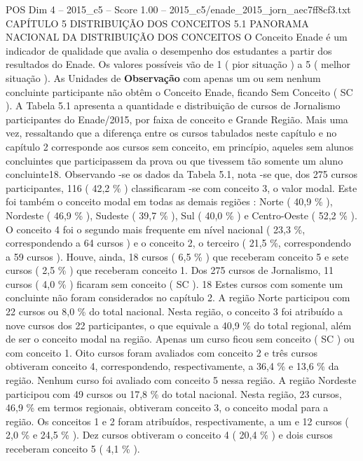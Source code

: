 \begin{textsample}{POS Dim 4 – 2015\_c5 – Score 1.00 – 2015\_c5/enade\_2015\_jorn\_aec7ff8cf3.txt}  \label{ex:f4_pos_165}
CAPÍTULO 5 DISTRIBUIÇÃO DOS CONCEITOS 5.1 PANORAMA NACIONAL DA DISTRIBUIÇÃO DOS CONCEITOS O Conceito Enade é um indicador de qualidade que avalia o desempenho dos estudantes a partir dos resultados do Enade.
Os valores possíveis vão de 1 ( pior situação ) a 5 ( melhor situação ).
As Unidades de \textbf{Observação} com apenas um ou sem nenhum concluinte participante não obtêm o Conceito Enade, ficando Sem Conceito ( SC ).
A Tabela 5.1 apresenta a quantidade e distribuição de cursos de Jornalismo participantes do Enade/2015, por faixa de conceito e Grande Região.
Mais uma vez, ressaltando que a diferença entre os cursos tabulados neste capítulo e no capítulo 2 corresponde aos cursos sem conceito, em princípio, aqueles sem alunos concluintes que participassem da prova ou que tivessem tão somente um aluno concluinte18.
Observando -se os dados da Tabela 5.1, nota -se que, dos 275 cursos participantes, 116 ( 42,2 \% ) classificaram -se com conceito 3, o valor modal.
Este foi também o conceito modal em todas as demais regiões : Norte ( 40,9 \% ), Nordeste ( 46,9 \% ), Sudeste ( 39,7 \% ), Sul ( 40,0 \% ) e Centro-Oeste ( 52,2 \% ).
O conceito 4 foi o segundo mais frequente em nível nacional ( 23,3 \%, correspondendo a 64 cursos ) e o conceito 2, o terceiro ( 21,5 \%, correspondendo a 59 cursos ).
Houve, ainda, 18 cursos ( 6,5 \% ) que receberam conceito 5 e sete cursos ( 2,5 \% ) que receberam conceito 1.
Dos 275 cursos de Jornalismo, 11 cursos ( 4,0 \% ) ficaram sem conceito ( SC ). 18 Estes cursos com somente um concluinte não foram considerados no capítulo 2.
A região Norte participou com 22 cursos ou 8,0 \% do total nacional.
Nesta região, o conceito 3 foi atribuído a nove cursos dos 22 participantes, o que equivale a 40,9 \% do total regional, além de ser o conceito modal na região.
Apenas um curso ficou sem conceito ( SC ) ou com conceito 1.
Oito cursos foram avaliados com conceito 2 e três cursos obtiveram conceito 4, correspondendo, respectivamente, a 36,4 \% e 13,6 \% da região.
Nenhum curso foi avaliado com conceito 5 nessa região.
A região Nordeste participou com 49 cursos ou 17,8 \% do total nacional.
Nesta região, 23 cursos, 46,9 \% em termos regionais, obtiveram conceito 3, o conceito modal para a região.
Os conceitos 1 e 2 foram atribuídos, respectivamente, a um e 12 cursos ( 2,0 \% e 24,5 \% ).
Dez cursos obtiveram o conceito 4 ( 20,4 \% ) e dois cursos receberam conceito 5 ( 4,1 \% ).

\end{textsample}
